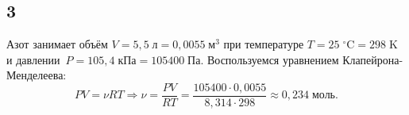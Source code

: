 \subsection{3}

Азот занимает объём $V=5{,}5\;\text{л}=0{,}0055\;\text{м}^3$ при температуре $T=25\;^\circ\text{C}=298\;\text{K}$ и давлении~$P=105{,}4\;\text{кПа}=105400\;\text{Па}$. Воспользуемся уравнением Клапейрона-Менделеева:
\[
PV=\nu RT\Rightarrow\nu=\frac{PV}{RT}=\frac{105400\cdot0{,}0055}{8{,}314\cdot298}\approx0{,}234\;\text{моль}.
\]